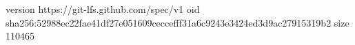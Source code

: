 version https://git-lfs.github.com/spec/v1
oid sha256:52988ec22fae41df27e051609ceccefff31a6c9243e3424ed3d9ac27915319b2
size 110465
